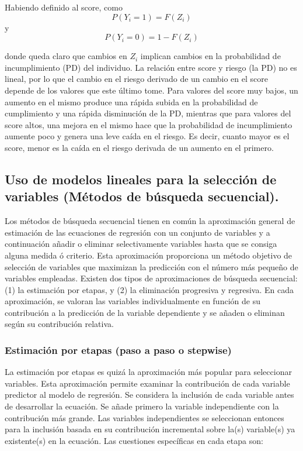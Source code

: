 \documentclass[
  12pt,
]{krantz}
\theoremstyle{definition}
\theoremstyle{definition}
\theoremstyle{definition}
\theoremstyle{remark}
\begin{document}
Habiendo definido al score, como \[P(Y_i=1)=F(Z_i)\] y \[P(Y_i=0)=1-F(Z_i)\]

donde queda claro que cambios en \(Z_i\) implican cambios en la probabilidad de incumplimiento (PD) del individuo. La relación entre score y riesgo (la PD) no es lineal, por lo que el cambio en el riesgo derivado de un cambio en el score depende de los valores que este último tome. Para valores del score muy bajos, un aumento en el mismo produce una rápida subida en la probabilidad de cumplimiento y una rápida disminución de la PD, mientras que para valores del score altos, una mejora en el mismo hace que la probabilidad de incumplimiento aumente poco y genera una leve caída en el riesgo. Es decir, cuanto mayor es el score, menor es la caída en el riesgo derivada de un aumento en el primero.

\hypertarget{uso-de-modelos-lineales-para-la-seleccion-de-variables-metodos-de-busqueda-secuencial.}{%
\subsection{Uso de modelos lineales para la selección de variables (Métodos de búsqueda secuencial).}\label{uso-de-modelos-lineales-para-la-seleccion-de-variables-metodos-de-busqueda-secuencial.}}

Los métodos de búsqueda secuencial tienen en común la aproximación general de estimación de las ecuaciones de regresión con un conjunto de variables y a continuación añadir o eliminar selectivamente variables hasta que se consiga alguna medida ó criterio. Esta aproximación proporciona un método objetivo de selección de variables que maximizan la predicción con el número más pequeño de variables empleadas. Existen dos tipos de aproximaciones de búsqueda secuencial: (1) la estimación por etapas, y (2) la eliminación progresiva y regresiva. En cada aproximación, se valoran las variables individualmente en función de su contribución a la predicción de la variable dependiente y se añaden o eliminan según su contribución relativa.

\hypertarget{estimacion-por-etapas-paso-a-paso-o-stepwise}{%
\subsubsection{Estimación por etapas (paso a paso o stepwise)}\label{estimacion-por-etapas-paso-a-paso-o-stepwise}}

La estimación por etapas es quizá la aproximación más popular para seleccionar variables. Esta aproximación permite examinar la contribución de cada variable predictor al modelo de regresión. Se considera la inclusión de cada variable antes de desarrollar la ecuación. Se añade primero la variable independiente con la contribución más grande. Las variables independientes se seleccionan entonces para la inclusión basada en su contribución incremental sobre la(s) variable(s) ya existente(s) en la ecuación. Las cuestiones específicas en cada etapa son:
\end{document}
